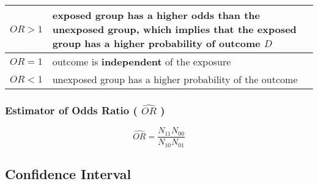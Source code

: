 \begin{customTableWrapper}{1.5}
\begin{table}[H]
    \centering
    \begin{tabular}{|l|p{11cm}|}
        \hline

        $OR > 1$ & exposed group has a higher odds than the unexposed group, which implies that the exposed group has a higher probability of outcome $D$ \\
        \hline

        $OR = 1$ & outcome is \textbf{independent} of the exposure \\
        \hline

        $OR < 1$ & unexposed group has a higher probability of the outcome \\
        \hline

    \end{tabular}
\end{table}
\end{customTableWrapper}

\subsubsection{Estimator of Odds Ratio ( $\hat{OR}$ ) \cite{ism-1}}\label{Estimator of Odds Ratio}

\[
    \hat{OR}
    = \dfrac{N_{11}N_{00}}{N_{10}N_{01}}
\]



\subsection{Confidence Interval \cite{ism-1}} \label{Measures of risk: Confidence Interval}

